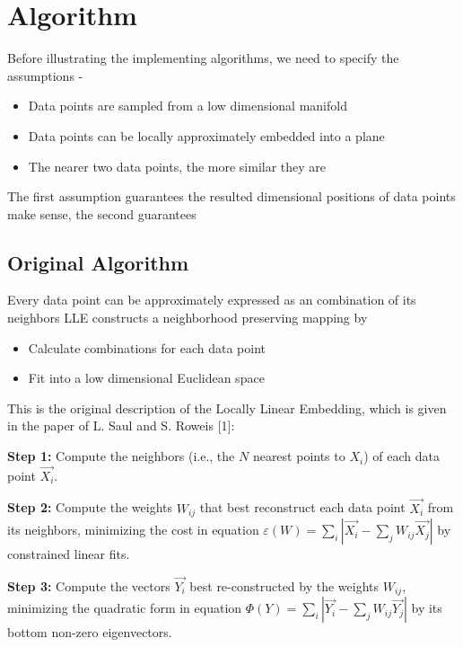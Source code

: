 \documentclass[12pt]{article} %
\begin{document}

\section{Algorithm} %

Before illustrating the implementing algorithms, we need to specify the assumptions - 
\begin{itemize}
  \item Data points are sampled from a low dimensional manifold
  \item Data points can be locally approximately embedded into a plane
  \item The nearer two data points, the more similar they are 
\end{itemize}
The first assumption guarantees the resulted dimensional positions of data points make sense, the second guarantees 


\subsection{Original Algorithm} %
Every data point can be approximately expressed as an combination of its neighbors
LLE constructs a neighborhood preserving mapping by
\begin{itemize}
	\item Calculate combinations for each data point
	\item Fit into a low dimensional Euclidean space
\end{itemize}

This is the original description of the Locally Linear Embedding, which is given in the paper of L. Saul and S. Roweis [1]:

\textbf{Step 1:} Compute the neighbors (i.e., the $N$ nearest points to $X_i$) of each data point $\overrightarrow{X_i}$.

\textbf{Step 2:} Compute the weights $W_{ij}$ that best reconstruct each data point $\overrightarrow{X_i}$ from its neighbors, minimizing the cost in equation $\displaystyle\varepsilon(W)=\sum_i|\overrightarrow{X_i}-\sum_{j}W_{ij}\overrightarrow{X_j}|$ by constrained linear fits.

\textbf{Step 3:} Compute the vectors $\overrightarrow{Y_i}$ best re-constructed by the weights $W_{ij}$, minimizing the quadratic form in equation $\displaystyle\Phi(Y)=\sum_i|\overrightarrow{Y_i}-\sum_jW_{ij}\overrightarrow{Y_j}|$ by its bottom non-zero eigenvectors.
\end{document}
